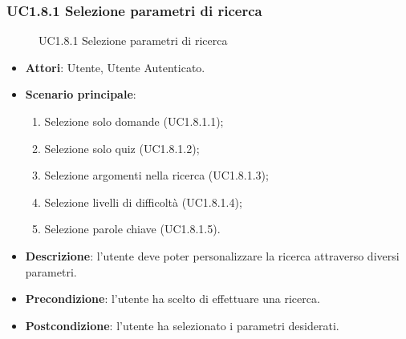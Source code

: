 \subsubsection{UC1.8.1 Selezione parametri di ricerca}
\begin{figure}[H]
\centering
\noindent{}
\caption{UC1.8.1 Selezione parametri di ricerca}
\end{figure}
\begin{itemize}
\item \textbf{Attori}: Utente, Utente Autenticato.
\item \textbf{Scenario principale}:
\begin{enumerate}
\item Selezione solo domande (UC1.8.1.1);
\item Selezione solo quiz (UC1.8.1.2);
\item Selezione argomenti nella ricerca (UC1.8.1.3);
\item Selezione livelli di difficoltà (UC1.8.1.4);
\item Selezione parole chiave (UC1.8.1.5).
\end{enumerate}
\item \textbf{Descrizione}: l’utente deve poter personalizzare la ricerca attraverso diversi parametri.
\item \textbf{Precondizione}: l’utente ha scelto di effettuare una ricerca.
\item \textbf{Postcondizione}: l’utente ha selezionato i parametri desiderati.
\end{itemize}
